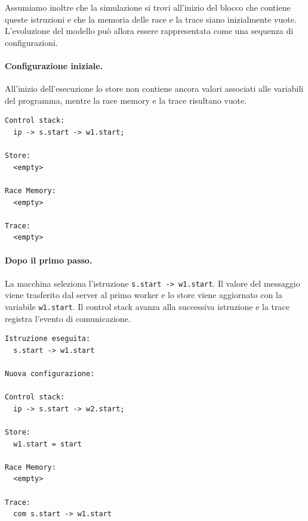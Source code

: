 Assumiamo inoltre che la simulazione si trovi all’inizio del blocco che contiene queste istruzioni e che la memoria delle race e la trace siano inizialmente vuote. L’evoluzione del modello può allora essere rappresentata come una sequenza di configurazioni.

\clearpage

\paragraph{Configurazione iniziale.}
All’inizio dell’esecuzione lo store non contiene ancora valori associati alle variabili del programma, mentre la race memory e la trace risultano vuote.

\begin{tcolorbox}[colback=black!2,colframe=black!35,boxrule=0.4pt,height=0.65\textheight]
\begin{verbatim}
Control stack:
  ip -> s.start -> w1.start;

Store:
  <empty>

Race Memory:
  <empty>

Trace:
  <empty>
\end{verbatim}
\end{tcolorbox}

\clearpage

\paragraph{Dopo il primo passo.}
La macchina seleziona l’istruzione \texttt{s.start -> w1.start}. Il valore del messaggio viene trasferito dal server al primo worker e lo store viene aggiornato con la variabile \texttt{w1.start}. Il control stack avanza alla successiva istruzione e la trace registra l’evento di comunicazione.

\begin{tcolorbox}[colback=black!2,colframe=black!35,boxrule=0.4pt,height=0.65\textheight]
\begin{verbatim}
Istruzione eseguita:
  s.start -> w1.start

Nuova configurazione:

Control stack:
  ip -> s.start -> w2.start;

Store:
  w1.start = start

Race Memory:
  <empty>

Trace:
  com s.start -> w1.start
\end{verbatim}
\end{tcolorbox}

